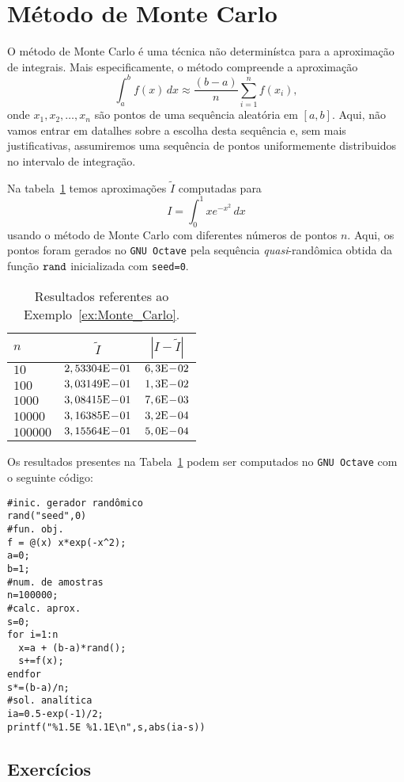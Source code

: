 \section{Método de Monte Carlo}\label{cap_integr_sec_Monte_Carlo}

O método de Monte Carlo é uma técnica não determinístca para a aproximação de integrais. Mais especificamente, o método compreende a aproximação
\begin{equation}
  \int_a^b f(x)\,dx \approx \frac{(b-a)}{n}\sum_{i=1}^n f(x_i),
\end{equation}
onde $x_1, x_2, \dotsc, x_n$ são pontos de uma sequência aleatória em $[a, b]$. Aqui, não vamos entrar em datalhes sobre a escolha desta sequência e, sem mais justificativas, assumiremos uma sequência de pontos uniformemente distribuidos no intervalo de integração.

\begin{ex}\label{ex:Monte_Carlo}
  Na tabela~\ref{tab:ex_Monte_Carlo} temos aproximações $\tilde{I}$ computadas para
  \begin{equation}
    I = \int_0^1 xe^{-x^2}\,dx
  \end{equation}
usando o método de Monte Carlo com diferentes números de pontos $n$. Aqui, os pontos foram gerados no \verb+GNU Octave+ pela sequência {\it quasi}-randômica obtida da função $\verb+rand+$ inicializada com \verb+seed=0+.

\begin{table}[h!]
  \centering
  \begin{tabular}{l|cc}
    $n$ & $\tilde{I}$ & $|I-\tilde{I}|$\\\hline
    $10$ & $2,53304\mathrm{E}\!-\!01$ & $6,3\mathrm{E}\!-\!02$\\
    $100$ & $3,03149\mathrm{E}\!-\!01$ & $1,3\mathrm{E}\!-\!02$ \\
    $1000$ & $3,08415\mathrm{E}\!-\!01$ & $7,6\mathrm{E}\!-\!03$ \\
    $10000$ & $3,16385\mathrm{E}\!-\!01$ & $3,2\mathrm{E}\!-\!04$ \\
    $100000$ & $3,15564\mathrm{E}\!-\!01$ & $5,0\mathrm{E}\!-\!04$ \\\hline
  \end{tabular}
  \caption{Resultados referentes ao Exemplo~\ref{ex:Monte_Carlo}.}
  \label{tab:ex_Monte_Carlo}
\end{table}

\ifisoctave
Os resultados presentes na Tabela~\ref{tab:ex_Monte_Carlo} podem ser computados no \verb+GNU Octave+ com o seguinte código:
\begin{verbatim}
#inic. gerador randômico
rand("seed",0)
#fun. obj.
f = @(x) x*exp(-x^2);
a=0;
b=1;
#num. de amostras
n=100000;
#calc. aprox.
s=0;
for i=1:n
  x=a + (b-a)*rand();
  s+=f(x);
endfor
s*=(b-a)/n;
#sol. analítica
ia=0.5-exp(-1)/2;
printf("%1.5E %1.1E\n",s,abs(ia-s))
\end{verbatim}
\fi
\end{ex}

\emconstrucao

\subsection{Exercícios}

\emconstrucao